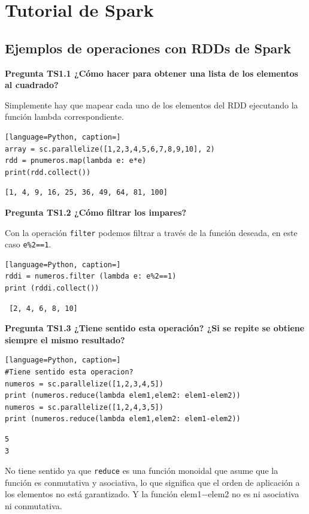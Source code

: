 \documentclass[10pt,swedish, openany]{book}
\begin{document}
\chapter{Tutorial de Spark}

\section{Ejemplos de operaciones con RDDs de Spark}

\textbf{Pregunta TS1.1 ¿Cómo hacer para obtener una lista de los elementos al cuadrado?}

Simplemente hay que mapear cada uno de los elementos del RDD ejecutando la función lambda correspondiente.

\begin{lstlisting}[language=Python, caption=]
array = sc.parallelize([1,2,3,4,5,6,7,8,9,10], 2)
rdd = pnumeros.map(lambda e: e*e)
print(rdd.collect())
\end{lstlisting}
\begin{verbatim}
[1, 4, 9, 16, 25, 36, 49, 64, 81, 100]
\end{verbatim}

\vspace{0.8em}

\textbf{Pregunta TS1.2 ¿Cómo filtrar los impares?}

Con la operación \texttt{filter} podemos filtrar a través de la función deseada, en este caso \texttt{e\%2==1}.
\begin{lstlisting}[language=Python, caption=]
rddi = numeros.filter (lambda e: e%2==1)
print (rddi.collect())
\end{lstlisting}
\begin{verbatim}
 [2, 4, 6, 8, 10]   
\end{verbatim}

\vspace{0.8em}

\textbf{Pregunta TS1.3 ¿Tiene sentido esta operación? ¿Si se repite se obtiene siempre el mismo resultado?}

\begin{lstlisting}[language=Python, caption=]
#Tiene sentido esta operacion?
numeros = sc.parallelize([1,2,3,4,5])
print (numeros.reduce(lambda elem1,elem2: elem1-elem2))
numeros = sc.parallelize([1,2,4,3,5])
print (numeros.reduce(lambda elem1,elem2: elem1-elem2))
\end{lstlisting}
\begin{verbatim}
5
3
\end{verbatim}
No tiene sentido ya que \texttt{reduce} es una función monoidal que asume que la función es conmutativa y asociativa, lo que significa que el orden de aplicación a los elementos no está garantizado. Y la función elem1$-$elem2 no es ni asociativa ni conmutativa.
\end{document}
